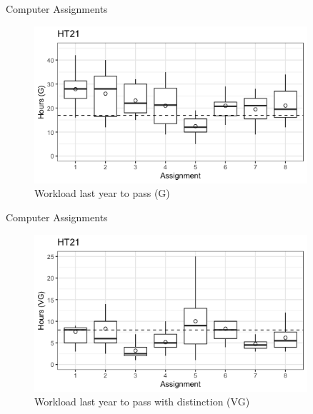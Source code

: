 \documentclass[10pt,handout]{beamer}
\begin{document}
\begin{frame}{Computer Assignments}

\begin{figure}[h]
\caption{Workload last year to pass (G)}
\centering
\includegraphics[width=0.9\textwidth]{figs/G.png}
\end{figure}

\end{frame}

\begin{frame}{Computer Assignments}

\begin{figure}[h]
\caption{Workload last year to pass with distinction (VG)}
\centering
\includegraphics[width=0.9\textwidth]{figs/VG.png}
\end{figure}

\end{frame}
\end{document}
